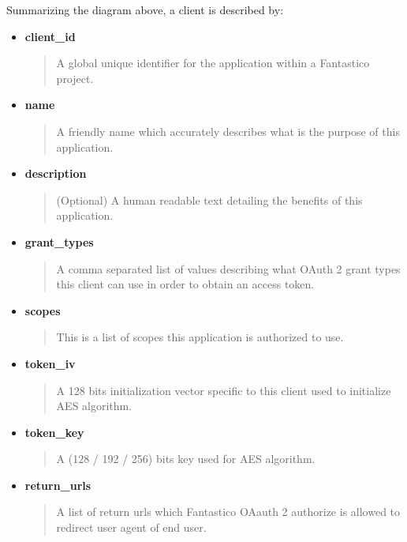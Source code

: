\documentclass[letterpaper,10pt,english]{sphinxmanual}
\begin{document}
Summarizing the diagram above, a client is described by:
\begin{itemize}
\item {} 
\textbf{client\_id}
\begin{quote}

A global unique identifier for the application within a Fantastico project.
\end{quote}

\item {} 
\textbf{name}
\begin{quote}

A friendly name which accurately describes what is the purpose of this application.
\end{quote}

\item {} 
\textbf{description}
\begin{quote}

(Optional) A human readable text detailing the benefits of this application.
\end{quote}

\item {} 
\textbf{grant\_types}
\begin{quote}

A comma separated list of values describing what OAuth 2 grant types this client can use in order to obtain an access token.
\end{quote}

\item {} 
\textbf{scopes}
\begin{quote}

This is a list of scopes this application is authorized to use.
\end{quote}

\item {} 
\textbf{token\_iv}
\begin{quote}

A 128 bits initialization vector specific to this client used to initialize AES algorithm.
\end{quote}

\item {} 
\textbf{token\_key}
\begin{quote}

A (128 / 192 / 256) bits key used for AES algorithm.
\end{quote}

\item {} 
\textbf{return\_urls}
\begin{quote}

A list of return urls which Fantastico OAauth 2 authorize is allowed to redirect user agent of end user.
\end{quote}

\end{itemize}
\end{document}

